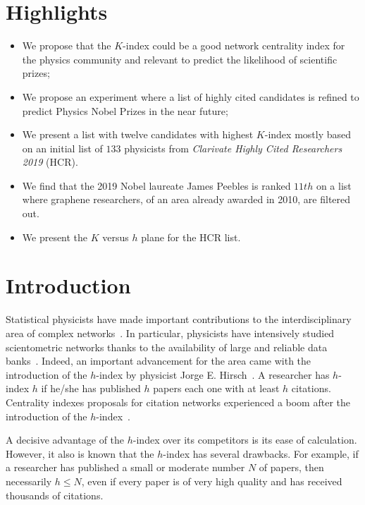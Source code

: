 \documentclass[final,3p,times]{elsarticle}
\begin{document}
\section*{Highlights}
\begin{itemize}
\item We propose that the $K$-index could be a good network centrality index for the physics community and relevant to predict the likelihood of scientific prizes;
\item We propose an experiment where a list of highly cited candidates is refined to predict Physics Nobel Prizes in the near future;
\item We present a list with twelve candidates with highest $K$-index mostly based on an initial list of $133$ physicists from {\em Clarivate Highly Cited Researchers 2019} (HCR). 
\item We find that the 2019 Nobel laureate James Peebles is
ranked  $11th$ on a list where 
graphene researchers, of an area already awarded in 2010, are filtered out.
\item We present the $K$ versus $h$ plane for the HCR list.
\end{itemize}

\section{Introduction}
\label{S:1}

Statistical physicists have made important contributions to the
interdisciplinary area of complex
networks~\cite{newmannetworks,barabasi2016network}.  In particular,
physicists have intensively studied scientometric networks thanks to the availability of large and reliable data
banks~\cite{newman2001structure,barabasi2002evolution,wang2008measuring,ren2012modeling,clough2016dimension,xie2016geometric}.
Indeed, an important advancement for the area came with  the introduction of the
$h$-index by physicist Jorge E. Hirsch~\cite{hirsch2005index}.  A
researcher has $h$-index $h$ if he/she has published $h$ 
papers each one with at least $h$ citations.  
Centrality indexes proposals for
citation networks experienced a boom after
the introduction of the $h$-index~\cite{batista2006possible, egghe2006improvement,hirsch2007does,
  schreiber2010twenty,todeschini2016handbook}.

A decisive advantage of the $h$-index over its competitors is its
ease of calculation. However, it also is known that the $h$-index has
several drawbacks. For example, if a researcher has published a small
or moderate number $N$ of papers, then necessarily $h \leq N$, even if
every paper is of very high quality and has received thousands of
citations.
\end{document}
